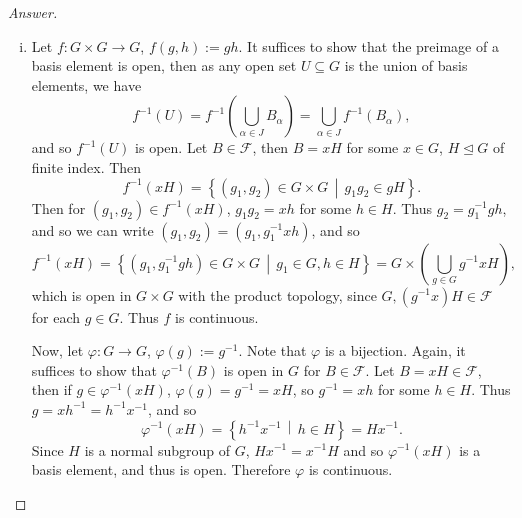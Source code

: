 \documentclass[12pt]{article}
\newcommand\inv[1]{#1^{-1}}
\newcommand\paren[1]{\left( #1 \right)}
\newcommand\setb[1]{\left \{ #1 \right \}}
\newcommand{\sqbrack}[1]{\left [ #1 \right ]}
\theoremstyle{definition}
\begin{document}
\begin{proof}[Answer]
\begin{enumerate}[(i)]
\begin{proof}
            \[
                H_1 H_2 / H_2 \cong H_1 / \paren{ H_1 \cap H_2 },
            \]
            and so 
            \[
                \sqbrack{ H_1 H_2 : H_2 } = \sqbrack{ H_1 : H_1 \cap H_2 }.
            \]
            Since $\sqbrack{ H_1 H_2 : H_2 }$ is the number of (left) cosets of $H_2$ in $H_1 H_2$, and since $H_1 H_2 \leq G$, $\sqbrack{ H_1 H_2 : H_2 } \leq \sqbrack{ G : H_2 } < \infty$. Thus $\sqbrack{ H_1 : H_1 \cap H_2 }$ is finite.
        \end{proof}
        Therefore $B_1 \cap B_2$ is itself an element of $\mathcal{F}$, and so $\mathcal{F}$ is a basis for a topology on $G$.
        \item Let $f : G \times G \to G$, $f(g,h) := gh$. It suffices to show that the preimage of a basis element is open, then as any open set $U \subseteq G$ is the union of basis elements, we have
        \[
            \inv{f}(U) = \inv{f} \paren{ \bigcup\limits_{ \alpha \in J} B_{\alpha} } = \bigcup\limits_{ \alpha \in J } \inv{f} \paren{ B_{\alpha} }, 
        \]
        and so $\inv{f}(U)$ is open. Let $B \in \mathcal{F}$, then $B = xH$ for some $x \in G$, $H \trianglelefteq G$ of finite index. Then 
        \[
            \inv{f} (xH) = \setb{ \paren{ g_1 , g_2 } \in G \times G \, \middle| \, g_1g_2 \in gH }.
        \]
        Then for $\paren{ g_1 , g_2 } \in \inv{f}(xH)$, $g_1 g_2 = x h$ for some $h \in H$. Thus $g_2 = \inv{g_1} g h$, and so we can write $\paren{ g_1 , g_2 } = \paren{ g_1 , \inv{g_1} xh }$, and so 
        \[
            \inv{f}(xH) = \setb{ \paren{ g_1 , \inv{g_1} gh } \in G \times G \, \middle| \, g_1 \in G , h \in H } = G \times \paren{ \bigcup\limits_{g \in G} \inv{g} x H }  ,
        \]
        which is open in $G \times G$ with the product topology, since $G , \paren{ \inv{g} x } H \in \mathcal{F}$ for each $g \in G$. Thus $f$ is continuous.
        
        Now, let $\varphi : G \to G$, $\varphi(g) := \inv{g}$. Note that $\varphi$ is a bijection. Again, it suffices to show that $\inv{\varphi}(B)$ is open in $G$ for $B \in \mathcal{F}$. Let $B = xH \in \mathcal{F}$, then if $g \in \inv{\varphi}(xH)$, $\varphi(g) = \inv{g} = xH$, so $\inv{g} = xh$ for some $h \in H$. Thus $g = \inv{xh} = \inv{h} \inv{x}$, and so \[
            \inv{\varphi}(xH) = \setb{ \inv{h} \inv{x} \, \middle| \, h \in H } = H \inv{x}.
        \]
        Since $H$ is a normal subgroup of $G$, $H \inv{x} = \inv{x} H$ and so $\inv{\varphi}(xH)$ is a basis element, and thus is open. Therefore $\varphi$ is continuous.
        

\end{enumerate}
\end{proof}
\end{document}
